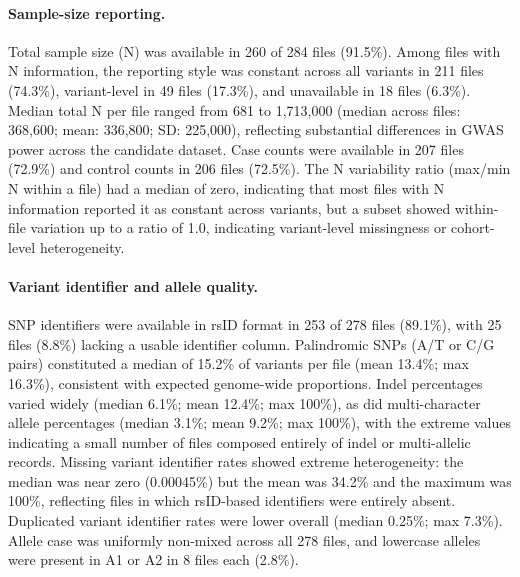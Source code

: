 \documentclass[11pt,a4paper]{article}
\begin{document}
\paragraph{Sample-size reporting.}Total sample size (N) was available in 260 of 284 files (91.5\%). Among files with N information, the reporting style was constant across all variants in 211 files (74.3\%), variant-level in 49 files (17.3\%), and unavailable in 18 files (6.3\%). Median total N per file ranged from 681 to 1,713,000 (median across files: 368,600; mean: 336,800; SD: 225,000), reflecting substantial differences in GWAS power across the candidate dataset. Case counts were available in 207 files (72.9\%) and control counts in 206 files (72.5\%). The N variability ratio (max/min N within a file) had a median of zero, indicating that most files with N information reported it as constant across variants, but a subset showed within-file variation up to a ratio of 1.0, indicating variant-level missingness or cohort-level heterogeneity.

\paragraph{Variant identifier and allele quality.}SNP identifiers were available in rsID format in 253 of 278 files (89.1\%), with 25 files (8.8\%) lacking a usable identifier column. Palindromic SNPs (A/T or C/G pairs) constituted a median of 15.2\% of variants per file (mean 13.4\%; max 16.3\%), consistent with expected genome-wide proportions. Indel percentages varied widely (median 6.1\%; mean 12.4\%; max 100\%), as did multi-character allele percentages (median 3.1\%; mean 9.2\%; max 100\%), with the extreme values indicating a small number of files composed entirely of indel or multi-allelic records. Missing variant identifier rates showed extreme heterogeneity: the median was near zero (0.00045\%) but the mean was 34.2\% and the maximum was 100\%, reflecting files in which rsID-based identifiers were entirely absent. Duplicated variant identifier rates were lower overall (median 0.25\%; max 7.3\%). Allele case was uniformly non-mixed across all 278 files, and lowercase alleles were present in A1 or A2 in 8 files each (2.8\%).
\end{document}
